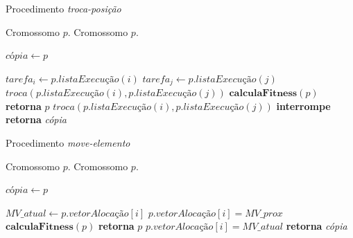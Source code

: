 \begin{algorithm}[H]
\caption{Procedimento \textit{troca-posição}}\label{algo:trocapos}

\begin{algorithmic}[1]
\Require Cromossomo $p$.
\Ensure Cromossomo $p$.
    
    \State $\textit{cópia} \gets p$
    
        \State $tarefa_i \gets p.\textit{listaExecução}(i)$
            \State $tarefa_j \gets p.\textit{listaExecução}(j)$
                \State $troca(p.\textit{listaExecução}(i), p.\textit{listaExecução}(j))$
                \State $\textbf{calculaFitness}(p)$ 
                    \State \textbf{retorna} $p$ 
                \Else
                    \State $troca(p.\textit{listaExecução}(i), p.\textit{listaExecução}(j))$ 
                \EndIf                
            \Else
                \State \textbf{interrompe} 
            \EndIf                
        \EndFor
    \EndFor    
    \State \textbf{retorna} \textit{cópia}
\end{algorithmic}
\end{algorithm}

\begin{algorithm}[H]
\caption{Procedimento \textit{move-elemento}}\label{algo:moveelem}

\begin{algorithmic}[1]
\Require Cromossomo $p$.
\Ensure Cromossomo $p$.
    
    \State $\textit{cópia} \gets p$
    
        \State $\textit{MV\_atual} \gets p.\textit{vetorAlocação}[i]$
                \State $p.\textit{vetorAlocação}[i] = \textit{MV\_prox}$
                \State $\textbf{calculaFitness}(p)$ 
                    \State \textbf{retorna} $p$ 
                \Else
                    \State $p.\textit{vetorAlocação}[i] = \textit{MV\_atual}$ 
                \EndIf                
            \EndIf
        \EndFor
    \EndFor    
    \State \textbf{retorna} \textit{cópia}
\end{algorithmic}
\end{algorithm}


